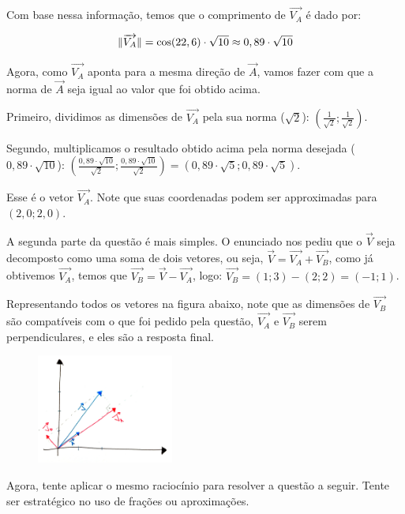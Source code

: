 \documentclass[main.tex]{subfiles}
\begin{document}
Com base nessa informação, temos que o comprimento de $\overrightarrow{V_A}$ é dado por:

$$
\Arrowvert \overrightarrow{V_A} \Arrowvert = \cos(22,6) \cdot \sqrt{10} \approx 0,89 \cdot \sqrt{10}
$$

Agora, como $\overrightarrow{V_A}$ aponta para a mesma direção de $\overrightarrow{A}$, vamos fazer com que a norma de $\overrightarrow{A}$ seja igual ao valor que foi obtido acima.

Primeiro, dividimos as dimensões de $\overrightarrow{V_A}$ pela sua norma ($\sqrt{2}$): $(\frac{1}{\sqrt{2}};\frac{1}{\sqrt{2}})$.

Segundo, multiplicamos o resultado obtido acima pela norma desejada ($0,89 \cdot \sqrt{10}$): $(\frac{0,89 \cdot \sqrt{10}}{\sqrt{2}};\frac{0,89 \cdot \sqrt{10}}{\sqrt{2}}) = (0,89 \cdot \sqrt{5};0,89 \cdot \sqrt{5})$.

Esse é o vetor $\overrightarrow{V_A}$. Note que suas coordenadas podem ser approximadas para $(2,0;2,0)$.

A segunda parte da questão é mais simples. O enunciado nos pediu que o $\overrightarrow{V}$ seja decomposto como uma soma de dois vetores, ou seja, $\overrightarrow{V}=\overrightarrow{V_A}+\overrightarrow{V_B}$, como já obtivemos $\overrightarrow{V_A}$, temos que $\overrightarrow{V_B}=\overrightarrow{V}-\overrightarrow{V_A}$, logo: $\overrightarrow{V_B}=(1;3)-(2;2)=(-1;1)$.

Representando todos os vetores na figura abaixo, note que as dimensões de $\overrightarrow{V_B}$ são compatíveis com o que foi pedido pela questão, $\overrightarrow{V_A}$ e $\overrightarrow{V_B}$ serem perpendiculares, e eles são a resposta final.

\begin{figure}[h]
\centering
\includegraphics[width=0.4\textwidth]{./img/c4r3.jpg}
\end{figure}

Agora, tente aplicar o mesmo raciocínio para resolver a questão a seguir. Tente ser estratégico no uso de frações ou aproximações.
\end{document}
